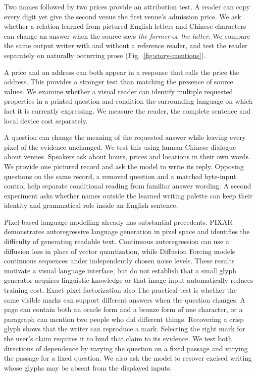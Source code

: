 \documentclass[12pt,a4paper]{article}
\providecommand{\DIFadd}[1]{{\protect\color{blue} \sf #1}} %
\providecommand{\DIFdel}[1]{{\protect\color{red} \scriptsize #1}} %
\providecommand{\DIFaddbegin}{} %
\providecommand{\DIFaddend}{} %
\providecommand{\DIFdelbegin}{} %
\providecommand{\DIFdelend}{} %
\begin{document}
\DIFadd{Two names followed by two prices provide an attribution test. A reader can copy every digit yet give the second venue the first venue's admission price. We ask whether a relation learned from pictured English letters and Chinese characters can change an answer when the source says \emph{the former} or \emph{the latter}. We compare the same output writer with and without a reference reader, and test the reader separately on naturally occurring prose (Fig.~\ref{fig:story-mentions}).
}

\DIFadd{A price and an address can both appear in a response that calls the price the address. This provides a stronger test than matching the presence of source values. We examine whether a visual reader can identify multiple requested properties in a printed question and condition the surrounding language on which fact it is currently expressing. We measure the reader, the complete sentence and local device cost separately.
}

\DIFadd{A question can change the meaning of the requested answer while leaving every pixel of the evidence unchanged. We test this using human Chinese dialogue about venues. Speakers ask about hours, prices and locations in their own words. We provide one pictured record and ask the model to write its reply. Opposing questions on the same record, a removed question and a matched byte-input control help separate conditional reading from familiar answer wording. A second experiment asks whether names outside the learned writing palette can keep their identity and grammatical role inside an English sentence}\DIFaddend .

\DIFdelbegin \DIFdel{Pixel-based language modelling already has substantial precedents. PIXAR demonstrates autoregressive language generation in pixel space and identifies the difficulty of generating readable text\cite{pixar}. Continuous
autoregression can use a diffusion loss in place of vector quantization\cite{mar},
while Diffusion Forcing models continuous sequences under independently chosen
noise levels\cite{forcing}. These results motivate a visual language interface, but do not establish that a small glyph generator acquires linguistic knowledge or that image input automatically reduces training cost. Exact pixel factorization also }\DIFdelend \DIFaddbegin \DIFadd{The practical test is whether the same visible marks can support different answers when the question changes. A page can contain both an oracle form and a bronze form of one character, or a paragraph can mention two people who did different things. Recovering a crisp glyph shows that the writer can reproduce a mark. Selecting the right mark for the user's claim requires it to bind that claim to its evidence. We test both directions of dependence by varying the question on a fixed passage and varying the passage for a fixed question. We also ask the model to recover excised writing whose glyphs may be absent from the displayed inputs.
}
\end{document}
